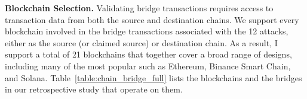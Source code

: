 \textbf{Blockchain Selection.}
%
Validating bridge transactions requires access to
transaction data from both the source and destination chains.  We
support every blockchain involved in the bridge transactions
associated with the 12 attacks, either as the source (or claimed
source) or destination chain.  As a result, I support a total of 21
blockchains that together cover a
broad range of designs, including many of the most popular such as 
Ethereum, Binance Smart Chain, and Solana.
%
Table~\ref{table:chain_bridge_full} lists the blockchains and the
bridges in our retrospective study that operate on them.%










